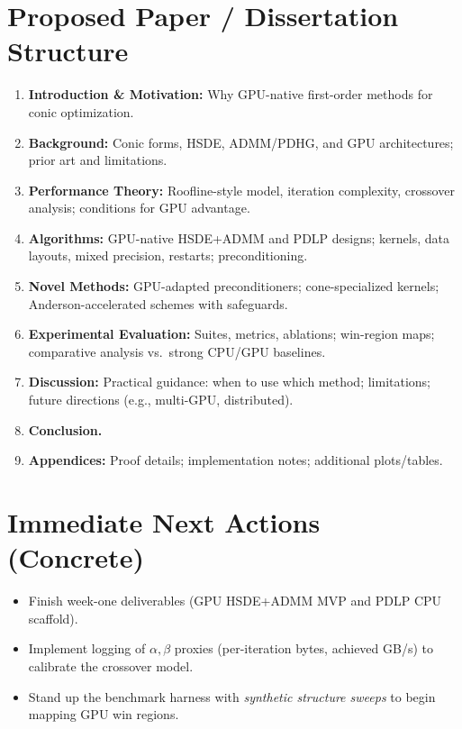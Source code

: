 \documentclass[12pt]{article}
\begin{document}
\section*{Proposed Paper / Dissertation Structure}
\begin{enumerate}
  \item \textbf{Introduction \& Motivation:} Why GPU-native first-order methods for conic optimization.
  \item \textbf{Background:} Conic forms, HSDE, ADMM/PDHG, and GPU architectures; prior art and limitations.
  \item \textbf{Performance Theory:} Roofline-style model, iteration complexity, crossover analysis; conditions for GPU advantage.
  \item \textbf{Algorithms:} GPU-native HSDE+ADMM and PDLP designs; kernels, data layouts, mixed precision, restarts; preconditioning.
  \item \textbf{Novel Methods:} GPU-adapted preconditioners; cone-specialized kernels; Anderson-accelerated schemes with safeguards.
  \item \textbf{Experimental Evaluation:} Suites, metrics, ablations; win-region maps; comparative analysis vs.\ strong CPU/GPU baselines.
  \item \textbf{Discussion:} Practical guidance: when to use which method; limitations; future directions (e.g., multi-GPU, distributed).
  \item \textbf{Conclusion.}
  \item \textbf{Appendices:} Proof details; implementation notes; additional plots/tables.
\end{enumerate}

\section*{Immediate Next Actions (Concrete)}
\begin{itemize}
  \item Finish week-one deliverables (GPU HSDE+ADMM MVP and PDLP CPU scaffold).
  \item Implement logging of $\alpha,\beta$ proxies (per-iteration bytes, achieved GB/s) to calibrate the crossover model.
  \item Stand up the benchmark harness with \emph{synthetic structure sweeps} to begin mapping GPU win regions.
\end{itemize}
\end{document}
